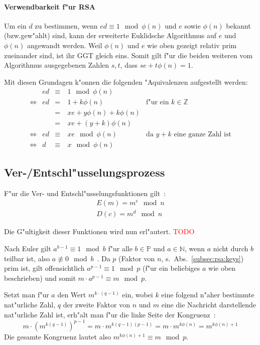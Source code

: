 \documentclass[12pt]{article}
\newcommand{\todo}[1]{\textcolor{red}{\mbox{TODO}}\marginpar{\textcolor{red}{#1}}}
\begin{document}
\paragraph{Verwendbarkeit f"ur RSA}

Um ein $d$ zu bestimmen, wenn $ed \equiv 1 \mod \phi(n) $ und $e$ sowie $\phi(n)$ bekannt (bzw.\@ gew"ahlt) sind,
kann der erweiterte Euklidsche Algorithmus auf $e$ und $\phi(n)$ angewandt werden.
Weil $\phi(n)$ und $e$ wie oben gezeigt relativ prim zueinander sind, ist ihr GGT gleich eins.
Somit gilt f"ur die beiden weiteren vom Algorithmus ausgegebenen Zahlen $s, t$, dass $se + t\phi(n) = 1$.

\noindent Mit diesen Grundagen k"onnen die folgenden "Aquivalenzen aufgestellt werden:
\[\begin{aligned}
      &ed &\equiv&~1 \mod \phi(n)& \\
      \iff&ed &=&~1 + k \phi(n) &\textrm{f"ur ein }k \in \mathbb{Z}\\
      &&=&~xe + y\phi(n) + k\phi(n)& \\
      &&=&~xe + (y+k)\phi(n) &\\
      \iff& ed &\equiv&~xe \mod \phi(n) &\textrm{da }y+k\textrm{ eine ganze Zahl ist}\\
      \iff& d &\equiv&~x \mod \phi(n)
  \end{aligned}
\]

\subsection{Ver-/Entschl"usselungsprozess}
F"ur die Ver- und Entschl"usselungsfunktionen gilt~\cite{rsa}:
\[
\begin{aligned}
E(m) = m^e \mod n \\
D(c) = m^d \mod n
\end{aligned}
\]

Die G"ultigkeit dieser Funktionen wird nun erl"autert. \todo{So oder and\-ers\-her\-um?}

Nach Euler gilt $a^{b-1} \equiv 1 \mod b$ f"ur alle $b \in \mathbb{P}$ und $a \in \mathbb{N}$,
wenn $a$ nicht durch $b$ teilbar ist, also $a \not\equiv 0 \mod b$~\cite{euler41}.
Da $p$ (Faktor von $n$, s.~Abs.~\ref{subsec:rsa:keys}) prim ist,
gilt offensichtlich $a^{p-1} \equiv 1 \mod p$
(f"ur ein beliebiges $a$ wie oben beschrieben) und somit $m \cdot a^{p-1} \equiv m \mod p$.

Setzt man f"ur $a$ den Wert $m^{k \cdot (q-1)}$ ein,
wobei $k$ eine folgend n"aher bestimmte nat"urliche Zahl, $q$ der zweite Faktor von $n$
und $m$ eine die Nachricht darstellende nat"urliche Zahl ist,
erh"alt man f"ur die linke Seite der Kongruenz~\cite{rsa}:
\[
    m \cdot \left(m^{k(q-1)}\right)^{p-1} = m \cdot m^{k(q-1)(p-1)} = m \cdot m^{k\phi(n)} = m^{k\phi(n) + 1}
\]
Die gesamte Kongruenz lautet also $m^{k\phi(n)+1} \equiv m \mod p$.
\end{document}
